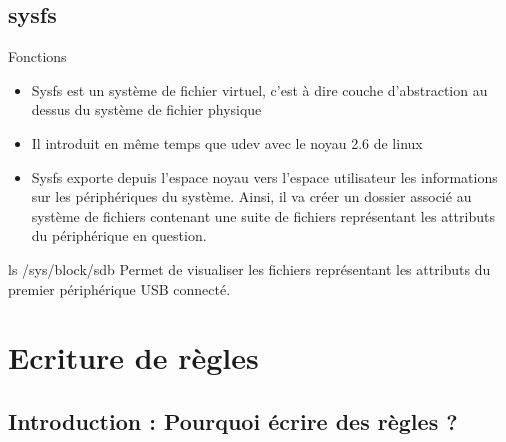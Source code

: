 \documentclass{beamer}
\begin{document}
\subsection{sysfs}

\begin{frame}
\begin{block}{Fonctions} 
	\begin{itemize}
		[circle]
		\item Sysfs est un système de fichier virtuel, c'est à dire couche d'abstraction au dessus du système de fichier physique
		\item Il introduit en même temps que udev avec le noyau 2.6 de linux 
		\item Sysfs exporte depuis l'espace noyau vers l'espace utilisateur les informations 
		sur les périphériques du système. Ainsi, il va créer un dossier associé au système de fichiers contenant une 
		suite de fichiers représentant les attributs du périphérique en question. 
	\end{itemize}
\end{block}

\begin{exampleblock}{ls /sys/block/sdb} 
	Permet de visualiser les fichiers représentant les attributs du premier périphérique USB connecté.
\end{exampleblock}
\end{frame}

\section{Ecriture de règles}

\subsection{Introduction : Pourquoi écrire des règles ?}
\end{document}
